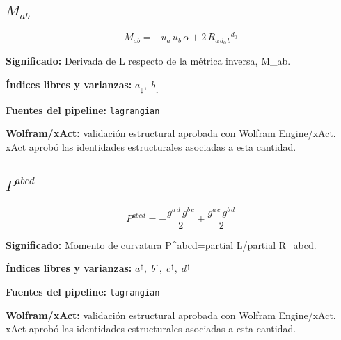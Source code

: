\documentclass[11pt]{article}
\begin{document}
\subsection*{$ M_{ab} $}
\begin{dmath*}[breakdepth={5}]
M_{ab} = -u{}_{a}\,u{}_{b}\,\alpha + 2\,R{}_{a\,d_{0}\,b}{}^{d_{0}}
\end{dmath*}
\par\vspace{1.2\baselineskip}\noindent
\begin{minipage}{\linewidth}
\textbf{Significado:} Derivada de L respecto de la métrica inversa, M\_ab.\par
\textbf{Índices libres y varianzas:} $ a_{\downarrow},\;b_{\downarrow} $\par
\textbf{Fuentes del pipeline:} \texttt{lagrangian}\par
\textbf{Wolfram/xAct:} validación estructural aprobada con Wolfram Engine/xAct. xAct aprobó las identidades estructurales asociadas a esta cantidad.\par
\end{minipage}
\subsection*{$ P^{abcd} $}
\begin{dmath*}[breakdepth={5}]
P^{abcd} = -\frac{g{}^{a\,d}\,g{}^{b\,c}}{2} + \frac{g{}^{a\,c}\,g{}^{b\,d}}{2}
\end{dmath*}
\par\vspace{1.2\baselineskip}\noindent
\begin{minipage}{\linewidth}
\textbf{Significado:} Momento de curvatura P^{abcd}=partial L/partial R\_abcd.\par
\textbf{Índices libres y varianzas:} $ a^{\uparrow},\;b^{\uparrow},\;c^{\uparrow},\;d^{\uparrow} $\par
\textbf{Fuentes del pipeline:} \texttt{lagrangian}\par
\textbf{Wolfram/xAct:} validación estructural aprobada con Wolfram Engine/xAct. xAct aprobó las identidades estructurales asociadas a esta cantidad.\par
\end{minipage}
\end{document}
